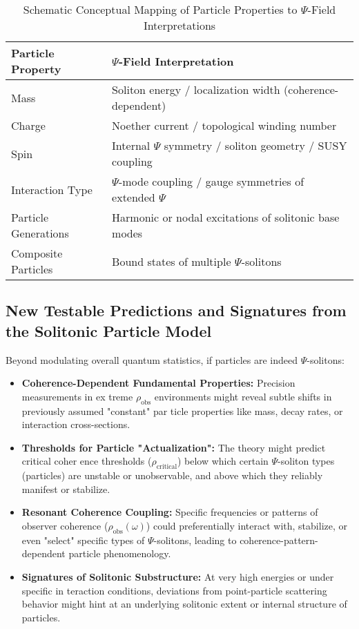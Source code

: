\documentclass{report}
\begin{document}
    \begin{table}[h!]
    \centering
    \caption{Schematic Conceptual Mapping of Particle Properties to $\Psi$-Field Interpretations}
    \label{tab:particle_psi_mapping}
    \begin{tabular}{|l|l|}
    \hline
    \textbf{Particle Property} & \textbf{$\Psi$-Field Interpretation} \\
    \hline
    Mass & Soliton energy / localization width (coherence-dependent) \\
    Charge & Noether current / topological winding number \\
    Spin & Internal $\Psi$ symmetry / soliton geometry / SUSY coupling \\
    Interaction Type & $\Psi$-mode coupling / gauge symmetries of extended $\Psi$ \\
    Particle Generations & Harmonic or nodal excitations of solitonic base modes \\
    Composite Particles & Bound states of multiple $\Psi$-solitons \\
    \hline
    \end{tabular}
    \end{table}

    \subsection{New Testable Predictions and Signatures from the Solitonic Particle Model}
    \label{subsec:testable_predictions_solitonic_model}
    Beyond modulating overall quantum statistics, if particles are indeed $\Psi$-solitons:
    \begin{itemize}
        \item \textbf{Coherence-Dependent Fundamental Properties:} Precision measurements in ex treme $\rho_{\text{obs}}$ environments might reveal subtle shifts in previously assumed "constant" par ticle properties like mass, decay rates, or interaction cross-sections.
        \item \textbf{Thresholds for Particle "Actualization":} The theory might predict critical coher ence thresholds ($\rho_{\text{critical}}$) below which certain $\Psi$-soliton types (particles) are unstable or unobservable, and above which they reliably manifest or stabilize.
        \item \textbf{Resonant Coherence Coupling:} Specific frequencies or patterns of observer coherence ($\rho_{\text{obs}}(\omega)$) could preferentially interact with, stabilize, or even "select" specific types of $\Psi$-solitons, leading to coherence-pattern-dependent particle phenomenology.
        \item \textbf{Signatures of Solitonic Substructure:} At very high energies or under specific in teraction conditions, deviations from point-particle scattering behavior might hint at an underlying solitonic extent or internal structure of particles.
    \end{itemize}
\end{document}
